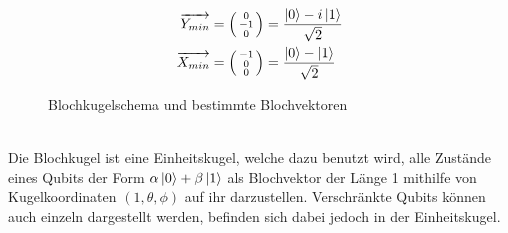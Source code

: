 \documentclass[12pt]{report}
\begin{document}
\begin{figure}[h]
\begin{subfigure}{.27\textwidth}
\begin{align*}
  			\overrightarrow{Y_{min}} &= \left( \begin{smallmatrix} 0\\-1\\0 \end{smallmatrix} \right) = \frac{\ket{0}-i\ket{1}}{\sqrt{2}} \\
  			\overrightarrow{X_{min}} &= \left( \begin{smallmatrix} -1\\0\\0 \end{smallmatrix} \right) = \frac{\ket{0}-\ket{1}}{\sqrt{2}} 		
  		\end{align*}
  		\vspace{0.62cm}
		\end{subfigure}
		\caption{Blochkugelschema und bestimmte Blochvektoren}
	\end{figure} \vspace{3mm} \\
	Die Blochkugel ist eine Einheitskugel, welche dazu benutzt wird, alle Zustände eines Qubits der Form $\alpha\ket{0} + \beta\ket{1}$ als Blochvektor der Länge 1 mithilfe von Kugelkoordinaten $(1,\theta,\phi)$ auf ihr darzustellen.
	Verschränkte Qubits können auch einzeln dargestellt werden, befinden sich dabei jedoch in der Einheitskugel.
	
\newpage	
	
\end{document}

